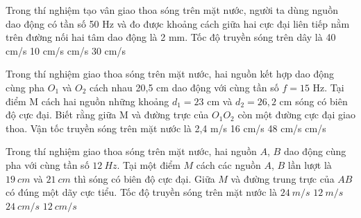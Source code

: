 \begin{ex}%
Trong thí nghiệm tạo vân giao thoa sóng trên mặt nước, người ta dùng nguồn dao động có tần số 50 Hz và đo được khoảng cách giữa hai cực đại liên tiếp nằm trên đường nối hai tâm dao động là 2 mm. Tốc độ truyền sóng trên dây là
\choice
{40 cm/s}
{10 cm/s}
{ cm/s}
{30 cm/s}
\end{ex} 
\begin{ex}%
Trong thí nghiệm giao thoa sóng trên mặt nước, hai nguồn kết hợp dao động cùng pha $O_1$ và $O_2$ cách nhau 20,5 cm dao động với cùng tần số $f=15$ Hz. Tại điểm M cách hai nguồn những khoảng $d_1 =23$ cm và $d_2=26,2$ cm sóng có biên độ cực đại. Biết rằng giữa M và đường trực của $O_1O_2$ còn một đường cực đại giao thoa. Vận tốc truyền sóng trên mặt nước là
\choice
{2,4 m/s}
{16 cm/s}
{48 cm/s}
{ cm/s}
\end{ex} 
\begin{ex}
Trong thí nghiệm giao thoa sóng trên mặt nước, hai nguồn $A$, $B$ dao động cùng pha với cùng tần số $12\ Hz$. Tại một điểm $M$ cách các nguồn $A$, $B$ lần lượt là $19\ cm$ và $21\ cm$ thì sóng có biên độ cực đại. Giữa $M$ và đường trung trực của $AB$ có đúng một dãy cực tiểu. Tốc độ truyền sóng trên mặt nước là
\choice
{$24\ m/s$}
{$12\ m/s$}
{\True $24\ cm/s$}
{$12\ cm/s$}
\end{ex}

